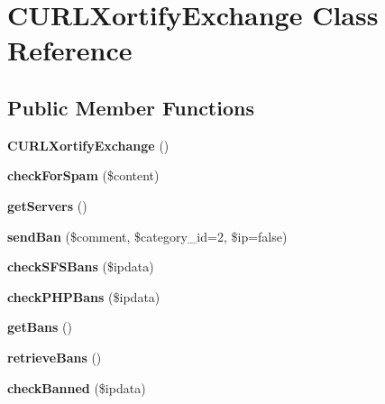 \hypertarget{class_c_u_r_l_xortify_exchange}{\section{C\-U\-R\-L\-Xortify\-Exchange Class Reference}
\label{class_c_u_r_l_xortify_exchange}
}
\subsection*{Public Member Functions}
\begin{DoxyCompactItemize}
\item 
\hypertarget{class_c_u_r_l_xortify_exchange_a3e47d53032637da1adeb1e4c5b1d4483}{{\bfseries C\-U\-R\-L\-Xortify\-Exchange} ()}\label{class_c_u_r_l_xortify_exchange_a3e47d53032637da1adeb1e4c5b1d4483}

\item 
\hypertarget{class_c_u_r_l_xortify_exchange_a7a4f53c3841dc7806455261af557d514}{{\bfseries check\-For\-Spam} (\$content)}\label{class_c_u_r_l_xortify_exchange_a7a4f53c3841dc7806455261af557d514}

\item 
\hypertarget{class_c_u_r_l_xortify_exchange_a882f365bc81e207dc2123ef707735e82}{{\bfseries get\-Servers} ()}\label{class_c_u_r_l_xortify_exchange_a882f365bc81e207dc2123ef707735e82}

\item 
\hypertarget{class_c_u_r_l_xortify_exchange_a0293acfa4afe0cb5b2816352a35d8ca7}{{\bfseries send\-Ban} (\$comment, \$category\-\_\-id=2, \$ip=false)}\label{class_c_u_r_l_xortify_exchange_a0293acfa4afe0cb5b2816352a35d8ca7}

\item 
\hypertarget{class_c_u_r_l_xortify_exchange_a985a563a84e3e5c54694fcce192bda53}{{\bfseries check\-S\-F\-S\-Bans} (\$ipdata)}\label{class_c_u_r_l_xortify_exchange_a985a563a84e3e5c54694fcce192bda53}

\item 
\hypertarget{class_c_u_r_l_xortify_exchange_aeb1bf9aaee4718870adbd07333490aaf}{{\bfseries check\-P\-H\-P\-Bans} (\$ipdata)}\label{class_c_u_r_l_xortify_exchange_aeb1bf9aaee4718870adbd07333490aaf}

\item 
\hypertarget{class_c_u_r_l_xortify_exchange_aea26db2906896833d32445a698fc4cdc}{{\bfseries get\-Bans} ()}\label{class_c_u_r_l_xortify_exchange_aea26db2906896833d32445a698fc4cdc}

\item 
\hypertarget{class_c_u_r_l_xortify_exchange_a4af29af927aae9aada97ef0c2cd08fa1}{{\bfseries retrieve\-Bans} ()}\label{class_c_u_r_l_xortify_exchange_a4af29af927aae9aada97ef0c2cd08fa1}

\item 
\hypertarget{class_c_u_r_l_xortify_exchange_ae41df0f26620b727f7f63342648f6474}{{\bfseries check\-Banned} (\$ipdata)}\label{class_c_u_r_l_xortify_exchange_ae41df0f26620b727f7f63342648f6474}

\end{DoxyCompactItemize}
